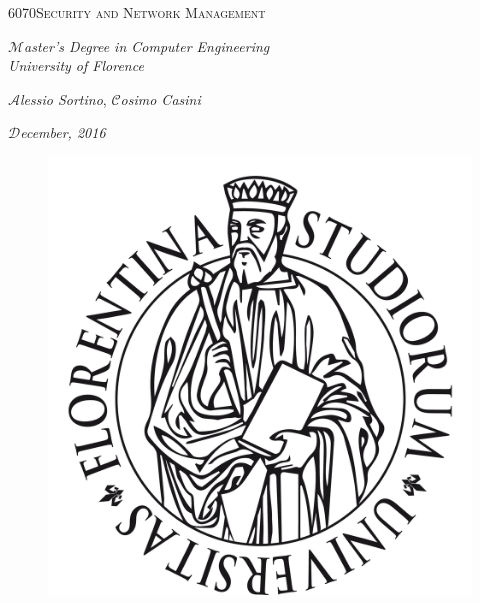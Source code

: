 \documentclass[a4paper,italian,11pt,openany]{book}
\makeatletter
\theoremstyle{definition}
\theoremstyle{proposition}
\theoremstyle{theorem}
\theoremstyle{definition}
\newcommand\HUGE{\@setfontsize\Huge{60}{70}}
\makeatother
\begin{document}
\begin{titlepage}
	\centering
	\vspace{1cm}
	
	{ {\HUGE \textsc{Security and Network Management}} \par}
	\vspace{3cm}
	{\huge $\mathcal{M}$\textit{aster's Degree in Computer Engineering\\University of Florence} \par}
	\vspace{0.5cm}
	{\LARGE $\mathcal{A}$\textit{lessio Sortino}, $\mathcal{C}$\textit{osimo Casini}\par}
	\vspace{0.7cm}
	{\Large $\mathcal{D}$\textit{ecember, 2016} \par}
	\begin{figure}[htbp]
		\centering
		\includegraphics[scale = 0.5]{header/logo-unifi.png}
		\label{header}
	\end{figure}
\end{titlepage}
\tableofcontents










%
\end{document}
